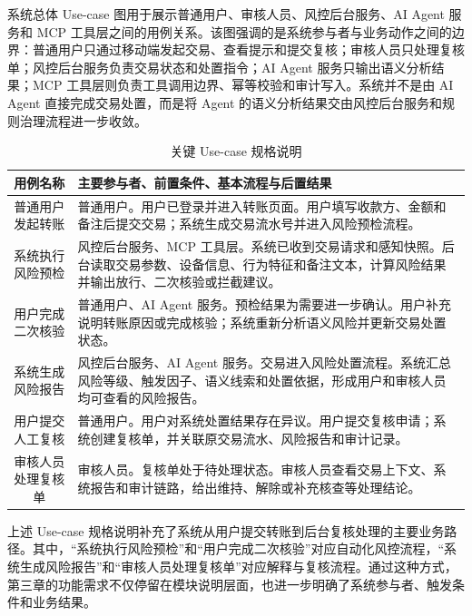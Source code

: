 \documentclass{xduugthesis}
\begin{document}
系统总体 Use-case 图用于展示普通用户、审核人员、风控后台服务、AI Agent 服务和 MCP 工具层之间的用例关系。该图强调的是系统参与者与业务动作之间的边界：普通用户只通过移动端发起交易、查看提示和提交复核；审核人员只处理复核单；风控后台服务负责交易状态和处置指令；AI Agent 服务只输出语义分析结果；MCP 工具层则负责工具调用边界、幂等校验和审计写入。系统并不是由 AI Agent 直接完成交易处置，而是将 Agent 的语义分析结果交由风控后台服务和规则治理流程进一步收敛。

\begin{table}[H]
    \centering
    \caption{关键 Use-case 规格说明}
    \label{tab:key-use-case-spec}
    \begin{tabularx}{\linewidth}{|c|Y|}
        \hline
        用例名称 & 主要参与者、前置条件、基本流程与后置结果 \\
        \hline
        普通用户发起转账 & 普通用户。用户已登录并进入转账页面。用户填写收款方、金额和备注后提交交易；系统生成交易流水号并进入风险预检流程。 \\
        \hline
        系统执行风险预检 & 风控后台服务、MCP 工具层。系统已收到交易请求和感知快照。后台读取交易参数、设备信息、行为特征和备注文本，计算风险结果并输出放行、二次核验或拦截建议。 \\
        \hline
        用户完成二次核验 & 普通用户、AI Agent 服务。预检结果为需要进一步确认。用户补充说明转账原因或完成核验；系统重新分析语义风险并更新交易处置状态。 \\
        \hline
        系统生成风险报告 & 风控后台服务、AI Agent 服务。交易进入风险处置流程。系统汇总风险等级、触发因子、语义线索和处置依据，形成用户和审核人员均可查看的风险报告。 \\
        \hline
        用户提交人工复核 & 普通用户。用户对系统处置结果存在异议。用户提交复核申请；系统创建复核单，并关联原交易流水、风险报告和审计记录。 \\
        \hline
        审核人员处理复核单 & 审核人员。复核单处于待处理状态。审核人员查看交易上下文、系统报告和审计链路，给出维持、解除或补充核查等处理结论。 \\
        \hline
    \end{tabularx}
\end{table}

上述 Use-case 规格说明补充了系统从用户提交转账到后台复核处理的主要业务路径。其中，“系统执行风险预检”和“用户完成二次核验”对应自动化风控流程，“系统生成风险报告”和“审核人员处理复核单”对应解释与复核流程。通过这种方式，第三章的功能需求不仅停留在模块说明层面，也进一步明确了系统参与者、触发条件和业务结果。
\end{document}
